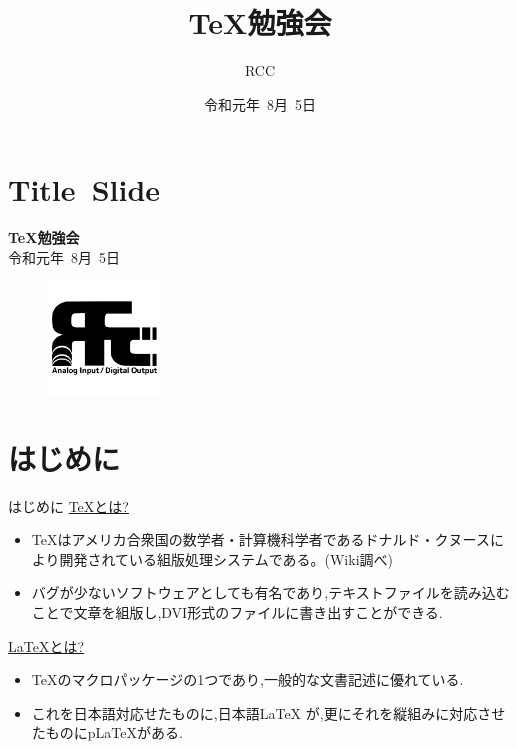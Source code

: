 \documentclass[dvipdfmx]{beamer}
\title{TeX勉強会}
\author{RCC}
\date{令和元年~8月~5日}
\begin{document}
  \section{Title~Slide}
  \begin{frame}
    \centering
    {\Huge \bf TeX勉強会}\\
    令和元年~8月~5日
    \begin{figure}[h]
      \centering
      \includegraphics[width=3cm]{images/iconRCC.png}
    \end{figure}
  \end{frame}
  \section{はじめに}
  \begin{frame}{はじめに}
    \Large
    \underline{\TeX とは?}
    \begin{itemize}
      \item {\scriptsize \TeX はアメリカ合衆国の数学者・計算機科学者であるドナルド・クヌースにより開発されている組版処理システムである。(Wiki調べ)}
      \item {\scriptsize バグが少ないソフトウェアとしても有名であり,テキストファイルを読み込むことで文章を組版し,DVI形式のファイルに書き出すことができる.}
    \end{itemize}
    \underline{\LaTeX とは?}
    \begin{itemize}
      \item {\scriptsize \TeX のマクロパッケージの1つであり,一般的な文書記述に優れている.}
      \item {\scriptsize これを日本語対応せたものに,日本語LaTeX が,更にそれを縦組みに対応させたものにpLaTeXがある.}
    \end{itemize}
  \end{frame}
\end{document}
